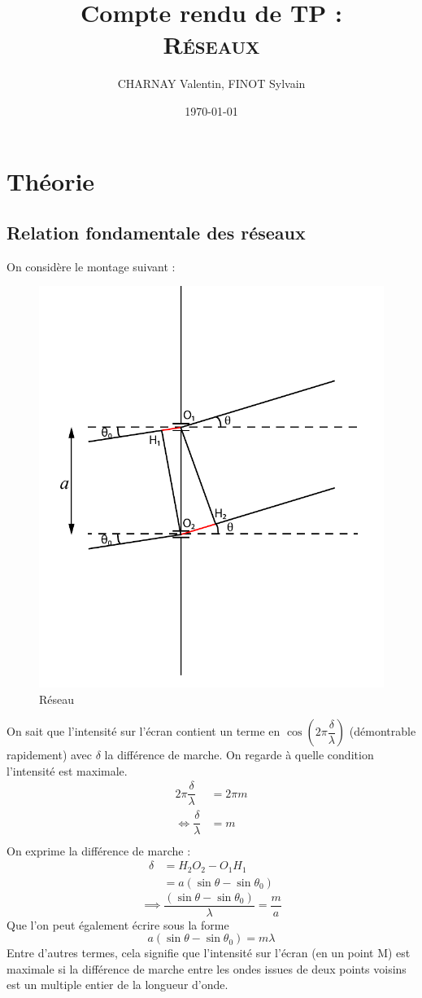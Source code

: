 \documentclass[12pt,a4paper]{article}
\author{CHARNAY Valentin, FINOT Sylvain}
\title{Compte rendu de TP :\\[4pt] \scshape Réseaux}
\date{\today}
\begin{document}
	\maketitle
	\section{Théorie}
	\subsection{Relation fondamentale des réseaux}
	On considère le montage suivant : 
	\begin{figure}[h]
		\centering
		\includegraphics[scale=1, trim=0 3cm 0 2.5cm,clip]{"res/Schema Young"}
		\caption[]{Réseau}
		\label{fig:schema-young}
	\end{figure}
	On sait que l'intensité sur l'écran contient un terme en $\cos(2\pi\dfrac{\delta}{\lambda})$ (démontrable rapidement) avec $\delta$ la différence de marche. On regarde à quelle condition l'intensité est maximale.\\
	\begin{align*}
	2\pi\dfrac{\delta}{\lambda} &= 2\pi m \\[1em]
	\iff\dfrac{\delta}{\lambda}  &= m\\
	\end{align*}
	On exprime la différence de marche :
	\begin{align*}
	\delta &= H_2O_2-O_1H_1\\
	&= a(\sin\theta-\sin \theta_0)
	\end{align*}
	$$\implies \dfrac{(\sin\theta-\sin \theta_0)}{\lambda}  = \dfrac{m}{a}$$
	Que l'on peut également écrire sous la forme
	$$a(\sin\theta-\sin \theta_0)=m\lambda$$
	Entre d'autres termes, cela signifie que l'intensité sur l'écran (en un point M) est maximale si la différence de marche entre les ondes issues de deux points voisins est un multiple entier de la longueur d'onde.
\end{document}
